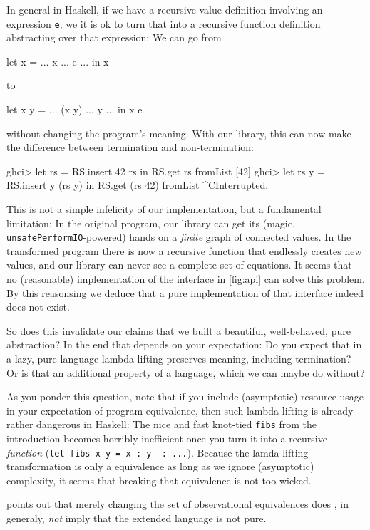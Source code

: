 \documentclass[manuscript,anonymous,screen,acmsmall]{acmart}
\begin{document}
In general in Haskell, if we have a recursive value definition involving an expression \verb|e|, we it is ok to turn that into a recursive function definition abstracting over that expression: We can go from
\begin{code}
let x = ... x ... e ... in x
\end{code}
to
\begin{code}
let x y = ... (x y) ... y ... in x e
\end{code}
without changing the program's meaning. With our library, this can now make the difference between termination and non-termination:
\begin{code}
ghci> let rs = RS.insert 42 rs in RS.get rs
fromList [42]
ghci> let rs y = RS.insert y (rs y) in RS.get (rs 42)
fromList ^CInterrupted.
\end{code}

This is not a simple infelicity of our implementation, but a fundamental limitation: In the original program, our library can get its (magic, \verb|unsafePerformIO|-powered) hands on a \emph{finite} graph of connected values. In the transformed program there is now a recursive function that endlessly creates new values, and our library can never see a complete set of equations. It seems that no (reasonable) implementation of the interface in \cref{fig:api} can solve this problem. By this reasonsing we deduce that a pure implementation of that interface indeed does not exist.

So does this invalidate our claims that we built a beautiful, well-behaved, pure abstraction? In the end that depends on your expectation: Do you expect that in a lazy, pure language lambda-lifting preserves meaning, including termination? Or is that an additional property of a language, which we can maybe do without?

As you ponder this question, note that if you include (asymptotic) resource usage in your expectation of program equivalence, then such lambda-lifting is already rather dangerous in Haskell: The nice and fast knot-tied \verb|fibs| from the introduction becomes horribly inefficient once you turn it into a recursive \emph{function} (\verb|let fibs x y = x : y  : ...|). Because the lamda-lifting transformation is only a equivalence as long as we ignore (asymptotic) complexity, it seems that breaking that equivalence is not too wicked.

 points out that merely changing the set of observational equivalences does , in generaly, \emph{not} imply that the extended language is not pure.
\end{document}
